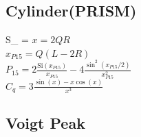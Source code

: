 



\subsection{Cylinder(PRISM)}

\BE S_ =  \EE
$x = 2QR$ \\[3mm]
$x_{P15} = Q(L-2R)$ \\[3mm]
$\displaystyle P_{15} = 2\frac{\text{Si}(x_{P15})}{x_{P15}} - 4\frac{\sin^2(x_{P15}/2)}{x_{P15}^2}$ \\[3mm]
$\displaystyle C_q = 3\frac{\sin(x)-x\cos(x)}{x^3}$ \\


\clearpage
\subsection{Voigt Peak} ~\\

